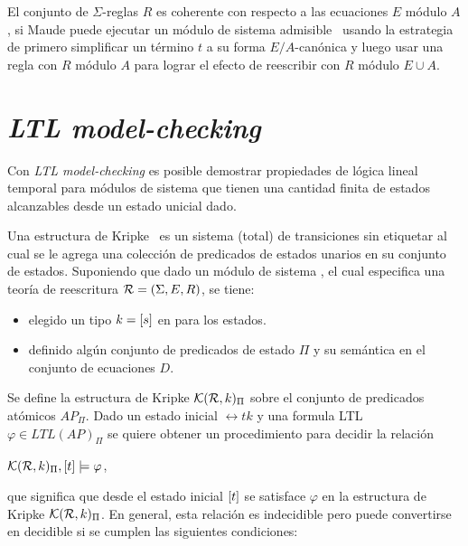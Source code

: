  El conjunto de $\Sigma$-reglas $R$ es coherente con respecto a las
 ecuaciones $E$ módulo $A$, si Maude puede ejecutar un módulo de sistema
 admisible~\cite{maude-book} usando la estrategia de primero simplificar
 un término $t$ a su forma $E/A$-canónica y luego usar una regla con $R$
 módulo $A$ para lograr el efecto de reescribir con $R$ módulo $E \cup A$.

\section{{\em LTL model-checking}}
\label{ltl.prelim}

Con {\em LTL model-checking} es posible demostrar propiedades de lógica
lineal temporal para módulos de sistema que tienen una cantidad finita de
estados alcanzables desde un estado unicial dado.

Una estructura de Kripke~\cite{clarke-book} es un sistema (total) de
transiciones sin etiquetar al cual se le agrega una colección de
predicados de estados unarios en su conjunto de estados.
Suponiendo que dado un módulo de sistema , el cual especifica una
teoría de reescritura $\mathcal{R} = (\Sigma,E,R)$, se tiene:

\begin{itemize}
   \item elegido un tipo $k = [s]$ en  para los estados.
   
   \item definido algún conjunto de predicados de estado $\Pi$ y su
	semántica en el conjunto de ecuaciones $D$.
\end{itemize}

Se define la estructura de Kripke $\mathcal{K}(\mathcal{R},k)_{\Pi}$ sobre el conjunto
de predicados atómicos $AP_{\Pi}$. Dado un estado inicial $\rel{t}{k}$ y
una formula LTL $\varphi \in LTL(AP)_\Pi$ se quiere obtener un
procedimiento para decidir la relación

$\mathcal{K}(\mathcal{R},k)_{\Pi}, [t] \models \varphi$,

\noindent que significa que desde el estado inicial $[t]$ se
satisface $\varphi$ en la estructura de Kripke $\mathcal{K}(\mathcal{R},k)_{\Pi}$.
En general, esta relación es indecidible pero puede convertirse en
decidible si se cumplen las siguientes condiciones:

